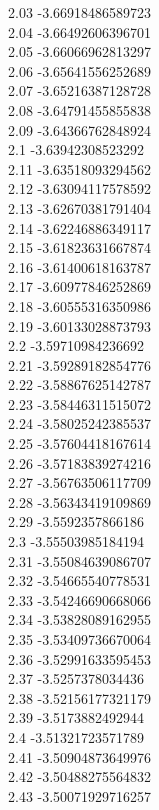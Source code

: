 {2.03	-3.66918486589723\\
2.04	-3.66492606396701\\
2.05	-3.66066962813297\\
2.06	-3.65641556252689\\
2.07	-3.65216387128728\\
2.08	-3.64791455855838\\
2.09	-3.64366762848924\\
2.1	-3.63942308523292\\
2.11	-3.63518093294562\\
2.12	-3.63094117578592\\
2.13	-3.62670381791404\\
2.14	-3.62246886349117\\
2.15	-3.61823631667874\\
2.16	-3.61400618163787\\
2.17	-3.60977846252869\\
2.18	-3.60555316350986\\
2.19	-3.60133028873793\\
2.2	-3.59710984236692\\
2.21	-3.59289182854776\\
2.22	-3.58867625142787\\
2.23	-3.58446311515072\\
2.24	-3.58025242385537\\
2.25	-3.57604418167614\\
2.26	-3.57183839274216\\
2.27	-3.56763506117709\\
2.28	-3.56343419109869\\
2.29	-3.5592357866186\\
2.3	-3.55503985184194\\
2.31	-3.55084639086707\\
2.32	-3.54665540778531\\
2.33	-3.54246690668066\\
2.34	-3.53828089162955\\
2.35	-3.53409736670064\\
2.36	-3.52991633595453\\
2.37	-3.5257378034436\\
2.38	-3.52156177321179\\
2.39	-3.5173882492944\\
2.4	-3.51321723571789\\
2.41	-3.50904873649976\\
2.42	-3.50488275564832\\
2.43	-3.50071929716257\\
}
